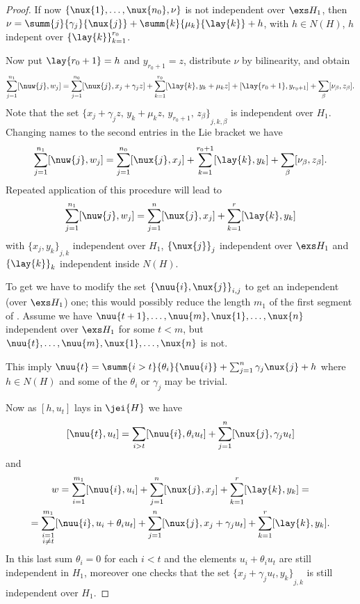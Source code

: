 \begin{proof}
If now $\{\nux{1},\dots,\nux{n_0},\nu\}$ is not independent over $\exs H_1$,
then ${\nu}=\summ{j}{\gamma_j}{\nux{j}}+
\summ{k}{\mu_k}{\lay{k}}+h$, with $h\in N(H)$, $h$ indepent over ${\{\lay{k}\}}_{k=1}^{r_0}$. %

Now put $\lay{r_0+1}=h$ and $y_{r_0+1}=z$, distribute $\nu$ by bilinearity, and obtain
$$
\sum_{j=1}^{n_{1}}[\nuw{j}, w_j]=\sum_{j=1}^{n_0}[\nux{j}, x_j+\gamma_jz]+\sum_{k=1}^{r_0}[\lay{k},y_k+\mu_kz]
+[\lay{r_0+1},y_{r_0+1}]+\sum_{\beta}[\nu_{\beta},z_{\beta}].
$$
Note that the set ${\{x_j+\gamma_jz,\, y_k+\mu_kz,\, y_{r_{0}+1},\,z_{\beta}\}}_{j,k,\beta}$
is independent over $H_1$.
Changing names to the second entries in the Lie bracket we have
$$
\sum_{j=1}^{n_{1}}[\nuw{j}, w_j]=\sum_{j=1}^{n_0}[\nux{j}, x_j]+\sum_{k=1}^{r_{0}+1}[\lay{k},y_k]
+\sum_{\beta}[\nu_{\beta},z_{\beta}].
$$
Repeated application of this procedure will lead to
$$
\sum_{j=1}^{n_{1}}[\nuw{j}, w_j]=\sum_{j=1}^{n}[\nux{j}, x_j]+\sum_{k=1}^{r}[\lay{k},y_k]
$$
with ${\{x_{j},y_{k}\}}_{j,k}$ independent over $H_{1}$, ${\{\nux{j}\}}_{j}$ independent over $\exs H_{1}$ and
${\{\lay{k}\}}_{k}$ independent inside $N(H)$.

To get  we have to modify the set ${\{\nuu{i},\nux{j}\}}_{i,j}$ to get an independent
(over $\exs H_{1}$) one; this would possibly reduce the length $m_{1}$ of the first segment of .
Assume we have $\nuu{t+1},\dots,\nuu{m},\nux{1},\dots,\nux{n}$ independent over $\exs H_{1}$ for some
$t<m$, but
$\nuu{t},\dots,\nuu{m},\nux{1},\dots,\nux{n}$ is not.

This imply $\nuu{t}=\summ{i>t}{\theta_{i}}{\nuu{i}}+\sum_{j=1}^{n}\gamma_{j}\nux{j}+h$ where
$h\in N(H)$ and some of the $\theta_{i}$ or $\gamma_{j}$ may be trivial.

Now as $[h,u_{t}]$ lays in $\jei{H}$ we have
$$
[\nuu{t},u_{t}]=\sum_{i>t}[\nuu{i},\theta_{i}u_{t}]+\sum_{j=1}^{n}[\nux{j},\gamma_{j}u_{t}]
$$
and
\begin{multline*}
w=\sum_{i=1}^{m_{1}}[\nuu{i}, u_i]+\sum_{j=1}^n[\nux{j}, x_j]+\sum_{k=1}^r[\lay{k},y_k]=\\
=\sum_{\substack{i=1\\ i\neq t}}^{m_{1}}
[\nuu{i},u_{i}+\theta_{i}u_{t}]+\sum_{j=1}^{n}[\nux{j},x_{j}+\gamma_{j}u_{t}]+\sum_{k=1}^r[\lay{k},y_k].
\end{multline*}
In this last sum $\theta_{i}=0$ for each $i<t$ and the elements $u_{i}+\theta_{i}u_{t}$ are still independent
in $H_{1}$,
moreover one checks that the set ${\{x_{j}+\gamma_{j}u_{t},y_{k}\}}_{j,k}$ is still independent over $H_{1}$.


\end{proof}
